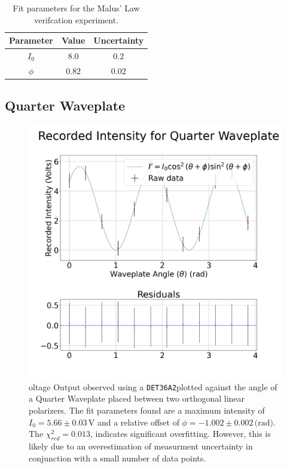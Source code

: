 \documentclass[aip, cp, amsmath, amssymb, reprint]{revtex4-2}
\newcommand{\pdiode}{\texttt{DET36A2}\space}
\begin{document}
            \begin{table}[H]
                \centering
                \begin{tabular}{c|c|c}
                    \bfseries Parameter & \bfseries Value & \bfseries Uncertainty \\
                    \hline
                    $I_0$ & $8.0$ & $0.2$ \\
                    $\phi$ & $0.82$ & $0.02$ \\
                \end{tabular}

                \caption{Fit parameters for the Malus' Law verifcation experiment.}
                \label{tab:malus}
            \end{table}

         \subsection{Quarter Waveplate}
            \begin{figure}[H]
                \centering
                \includegraphics[width=0.9\linewidth]{../figures/Quarter.png}
                \caption{oltage Output observed using a \pdiode plotted against the angle of a Quarter Waveplate placed between two orthogonal linear polarizers. The fit parameters found are a maximum intensity of $I_0 = 5.66 \pm 0.03\,\text{V}$ and a relative offset of $\phi = -1.002 \pm 0.002\,\text{(rad)}$. The $\chi_{red}^2 = 0.013$, indicates significant overfitting. However, this is likely due to an overestimation of measurment uncertainty in conjunction with a small number of data points.}
                \label{fig:part2a}
            \end{figure}
\end{document}
